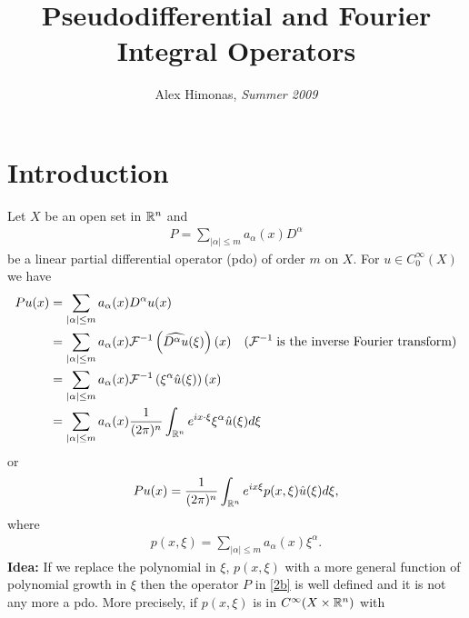 \documentclass[12pt,reqno]{amsart}
\theoremstyle{plain}  %
\theoremstyle{definition}
\newcommand{\nin}{\noindent}
\begin{document}
\title{Pseudodifferential and Fourier Integral Operators}
\author{Alex Himonas, {\it Summer 2009}}
\maketitle
\section{Introduction}
\nin
Let $ X $ be an open set in $ {{\Bbb R^n}} $ and
\begin{equation}
	\begin{split}
P = \sum_{|\alpha| \le m} a_\alpha (x) D^\alpha 
		\label{1}
	\end{split}
\end{equation}
be a linear partial differential operator (pdo) of order $ m $ on $ X$. 
For $ u \in C^\infty_0 (X) $ we have 
\begin{equation*}
	\begin{split}
Pu(x) &= \sum_{|\alpha| \le m} a_\alpha (x) D^\alpha u (x)\\
&= \sum_{|\alpha| \le m} a_\alpha (x) 
\mathcal{F}^{-1} \left ( \widehat{D^\alpha u} (\xi)
\right )  (x) \quad (\mathcal{F}^{-1} \; \text{is the inverse Fourier transform})\\
&= \sum_{|\alpha| \le m} a_\alpha (x)\mathcal{F}^{-1} \left ( \xi^\alpha \hat u (\xi)
\right ) (x)\\
&= \sum_{|\alpha| \le m} a_\alpha (x) \frac{1}{(2 \pi)^n} \int_{{\Bbb R^n}}
e^{i x \cdot \xi} \xi^\alpha \hat u (\xi) d \xi
\end{split}
\end{equation*}
or
\vskip-0.2in
\begin{equation}
	\begin{split}
		\label{2b}
		Pu(x) = \frac{1}{(2 \pi)^n} \int_{{\Bbb R^n}} e^{i x \xi} p(x, \xi) \hat u
(\xi)d\xi, 
	\end{split}
\end{equation}
where
\begin{equation}
	\begin{split}
p(x, \xi) = \sum_{|\alpha| \le m} a_\alpha (x) \xi^\alpha. 
		\label{3}
	\end{split}
\end{equation}
{\bf Idea:}    If we replace the polynomial in $ \xi$,   $p(x, \xi) $ with
a more general function of polynomial growth in $ \xi $ then the
operator $ P $ in \eqref{2b} is well defined and it is not any more a pdo.  More
precisely, if $ p(x, \xi) $ is in $ C^\infty (X \times {{\Bbb R^n}} ) $ with
\end{document}
